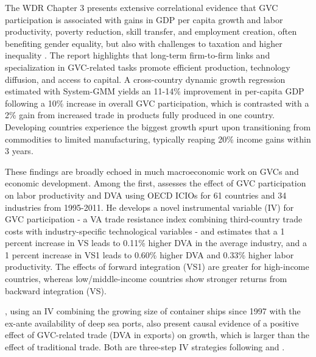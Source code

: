 \documentclass[a4paper]{article}
\begin{document}
The WDR Chapter 3 presents extensive correlational evidence that GVC participation is associated with gains in GDP per capita growth and labor productivity, poverty reduction, skill transfer, and employment creation, often benefiting gender equality, but also with challenges to taxation and higher inequality \citep{world2020trading, antras2022global}. The report highlights that long-term firm-to-firm links and specialization in GVC-related tasks promote efficient production, technology diffusion, and access to capital. A cross-country dynamic growth regression estimated with System-GMM yields an 11-14\% improvement in per-capita GDP following a 10\% increase in overall GVC participation, which is contrasted with a 2\% gain from increased trade in products fully produced in one country. Developing countries experience the biggest growth spurt upon transitioning from commodities to limited manufacturing, typically reaping 20\% income gains within 3 years. \newline

These findings are broadly echoed in much macroeconomic work on GVCs and economic development. Among the first, \citet{Kummritz20161} assesses the effect of GVC participation on labor productivity and DVA using OECD ICIOs for 61 countries and 34 industries from 1995-2011. He develops a novel instrumental variable (IV) for GVC participation - a VA trade resistance index combining third-country trade costs with industry-specific technological variables - and estimates that a 1 percent increase in VS leads to 0.11\% higher DVA in the average industry, and a 1 percent increase in VS1 leads to 0.60\% higher DVA and 0.33\% higher labor productivity. The effects of forward integration (VS1) are greater for high-income countries, whereas low/middle-income countries show stronger returns from backward integration (VS). \newline 

\citet{altomonte2018trade}, using an IV combining the growing size of container ships since 1997 with the ex-ante availability of deep sea ports, also present causal evidence of a positive effect of GVC-related trade (DVA in exports) on growth, which is larger than the effect of traditional trade. Both are three-step IV strategies following \citet{romer1999does} and \citet{feyrer2009distance, feyrer2019trade}. \newline 
\end{document}
